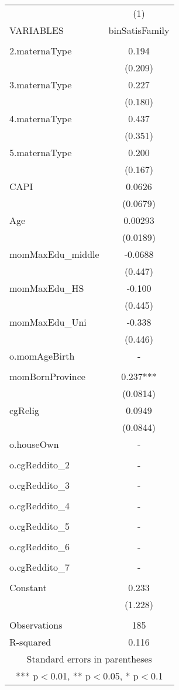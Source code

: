 \begin{tabular}{lc} \hline
 & (1) \\
VARIABLES & binSatisFamily \\ \hline
 &  \\
2.maternaType & 0.194 \\
 & (0.209) \\
3.maternaType & 0.227 \\
 & (0.180) \\
4.maternaType & 0.437 \\
 & (0.351) \\
5.maternaType & 0.200 \\
 & (0.167) \\
CAPI & 0.0626 \\
 & (0.0679) \\
Age & 0.00293 \\
 & (0.0189) \\
momMaxEdu\_middle & -0.0688 \\
 & (0.447) \\
momMaxEdu\_HS & -0.100 \\
 & (0.445) \\
momMaxEdu\_Uni & -0.338 \\
 & (0.446) \\
o.momAgeBirth & - \\
 &  \\
momBornProvince & 0.237*** \\
 & (0.0814) \\
cgRelig & 0.0949 \\
 & (0.0844) \\
o.houseOwn & - \\
 &  \\
o.cgReddito\_2 & - \\
 &  \\
o.cgReddito\_3 & - \\
 &  \\
o.cgReddito\_4 & - \\
 &  \\
o.cgReddito\_5 & - \\
 &  \\
o.cgReddito\_6 & - \\
 &  \\
o.cgReddito\_7 & - \\
 &  \\
Constant & 0.233 \\
 & (1.228) \\
 &  \\
Observations & 185 \\
 R-squared & 0.116 \\ \hline
\multicolumn{2}{c}{ Standard errors in parentheses} \\
\multicolumn{2}{c}{ *** p$<$0.01, ** p$<$0.05, * p$<$0.1} \\
\end{tabular}
